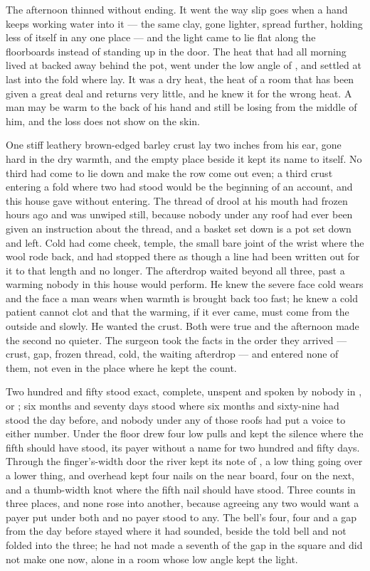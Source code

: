 The afternoon thinned without ending. It went the way slip goes when a hand keeps working water into it --- the same clay, gone lighter, spread further, holding less of itself in any one place --- and the light came to lie flat along the floorboards instead of standing up in the door. The heat that had all morning lived at  backed away behind the pot, went under the low angle of , and settled at last into the fold where  lay. It was a dry heat, the heat of a room that has been given a great deal and returns very little, and he knew it for the wrong heat. A man may be warm to the back of his hand and still be losing from the middle of him, and the loss does not show on the skin.

One stiff leathery brown-edged barley crust lay two inches from his ear, gone hard in the dry warmth, and the empty place beside it kept its name to itself. No third had come to lie down and make the row come out even; a third crust entering a fold where two had stood would be the beginning of an account, and this house gave without entering. The thread of drool at his mouth had frozen hours ago and was unwiped still, because nobody under any roof had ever been given an instruction about the thread, and a basket set down is a pot set down and left. Cold had come cheek, temple, the small bare joint of the wrist where the wool rode back, and had stopped there as though a line had been written out for it to that length and no longer. The afterdrop waited beyond all three, past a warming nobody in this house would perform. He knew the severe face cold wears and the face a man wears when warmth is brought back too fast; he knew a cold patient cannot clot and that the warming, if it ever came, must come from the outside and slowly. He wanted the crust. Both were true and the afternoon made the second no quieter. The surgeon took the facts in the order they arrived --- crust, gap, frozen thread, cold, the waiting afterdrop --- and entered none of them, not even in the place where he kept the count.

Two hundred and fifty stood exact, complete, unspent and spoken by nobody in ,  or ; six months and seventy days stood where six months and sixty-nine had stood the day before, and nobody under any of those roofs had put a voice to either number. Under the floor  drew four low pulls and kept the silence where the fifth should have stood, its payer without a name for two hundred and fifty days. Through the finger's-width door the river kept its note of , a low thing going over a lower thing, and overhead  kept four nails on the near board, four on the next, and a thumb-width knot where the fifth nail should have stood. Three counts in three places, and none rose into another, because agreeing any two would want a payer put under both and no payer stood to any. The bell's four, four and a gap from the day before stayed where it had sounded, beside the told bell and not folded into the three; he had not made a seventh of the gap in the square and did not make one now, alone in a room whose low angle kept the light.

